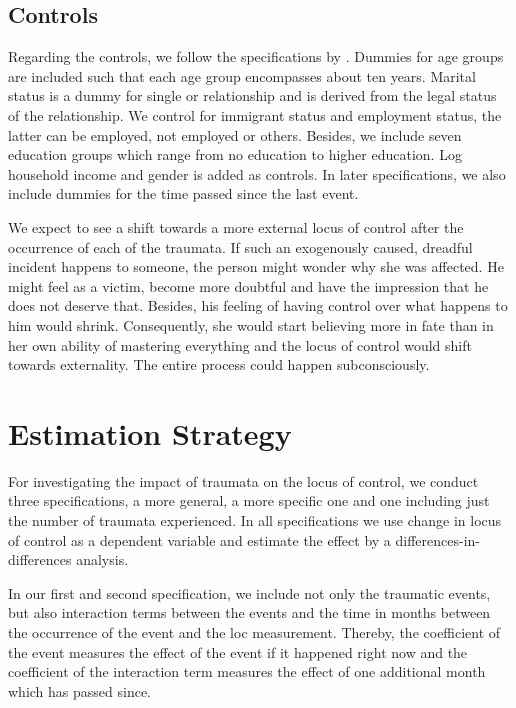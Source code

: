 \documentclass[12pt, a4paper, fleqn, parskip]{scrartcl}
\begin{document}

\subsection{Controls} %
\label{sub:controls}

Regarding the controls, we follow the specifications by \citet{cobb2013}.
Dummies for age groups are included such that each age group encompasses about
ten years. Marital status is a dummy for single or relationship and is derived
from the legal status of the relationship. We control for immigrant status and
employment status, the latter can be employed, not employed or others. Besides,
we include seven education groups which range from no education to higher
education. Log household income and gender is added as controls. In later
specifications, we also include dummies for the time passed since the last
event.


We expect to see a shift towards a more external locus of control after the
occurrence of each of the traumata. If such an exogenously caused, dreadful
incident happens to someone, the person might wonder why she was affected. He
might feel as a victim, become more doubtful and have the impression that he
does not deserve that. Besides, his feeling of having control over what happens
to him would shrink. Consequently, she would start believing more in fate than
in her own ability of mastering everything and the locus of control would shift
towards externality. The entire process could happen subconsciously.


\section{Estimation Strategy}
\label{sec:estimation_strategy}

For investigating the impact of traumata on the locus of control, we conduct
three specifications, a more general, a more specific one and one including
just the number of traumata experienced. In all specifications we use change in
locus of control as a dependent variable and estimate the effect by a
differences-in-differences analysis.

In our first and second specification, we include not only the traumatic
events, but also interaction terms between the events and the time in months
between the occurrence of the event and the loc measurement. Thereby, the
coefficient of the event measures the effect of the event if it happened right
now and the coefficient of the interaction term measures the effect of one
additional month which has passed since.
\end{document}
